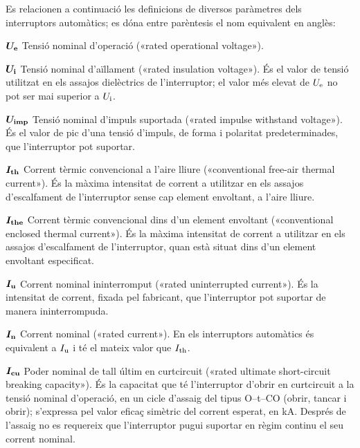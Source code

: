 Es relacionen a continuació les definicions de diversos paràmetres dels interruptors automàtics; es dóna entre parèntesis el nom equivalent en anglès:
\begin{list}{}
   {\setlength{\labelwidth}{10mm} \setlength{\leftmargin}{10mm} \setlength{\labelsep}{2mm}}
   \item[$\boldsymbol{U_\mathrm{e}}$] Tensió nominal d'operació («rated operational voltage»).
   \item[$\boldsymbol{U_\mathrm{i}}$] Tensió nominal d'aïllament («rated insulation voltage»). És el valor de tensió utilitzat en els assajos dielèctrics de l'interruptor;  el valor més elevat de $U_\mathrm{e}$ no pot ser mai superior a $U_\mathrm{i}$.
    \item[$\boldsymbol{U_\mathrm{imp}}$] Tensió nominal d'impuls suportada («rated impulse withstand voltage»). És el valor de pic d'una tensió d'impuls, de forma i polaritat predeterminades, que l'interruptor pot suportar.
   \item[$\boldsymbol{I_\mathrm{th}}$] Corrent tèrmic convencional a l'aire lliure («conventional free-air thermal current»).  És la  màxima intensitat de corrent a utilitzar en els assajos d'escalfament de l'interruptor sense cap element envoltant, a l'aire lliure.
   \item[$\boldsymbol{I_\mathrm{the}}$] Corrent tèrmic convencional dins d'un element envoltant («conventional enclosed thermal current»).  És la màxima intensitat de corrent a utilitzar en els assajos d'escalfament de l'interruptor, quan està situat dins d'un element envoltant especificat.
    \item[$\boldsymbol{I_\mathrm{u}}$] Corrent nominal ininterromput («rated uninterrupted current»).  És la intensitat  de corrent, fixada pel fabricant, que l'interruptor pot suportar de manera ininterrompuda.
    \item[$\boldsymbol{I_\mathrm{n}}$] Corrent nominal («rated current»).  En els interruptors automàtics és equivalent a $I_\mathrm{u}$ i té el mateix valor que $I_\mathrm{th}$.
    \item[$\boldsymbol{I_\mathrm{cu}}$] Poder nominal de tall últim en curtcircuit («rated ultimate  short-circuit breaking capacity»). És la capacitat que té l'interruptor d'obrir en curtcircuit a la tensió nominal d'operació, en un cicle d'assaig del tipus O--t--CO (obrir, tancar i obrir); s'expressa pel valor eficaç simètric del corrent esperat, en kA. Després de l'assaig no es requereix que l'interruptor pugui suportar en règim continu el seu corrent nominal.

\end{list}
